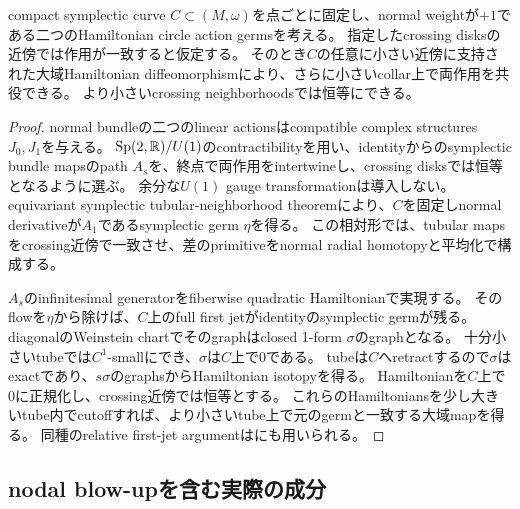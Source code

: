 \begin{lemma}\label{glue:circle}
compact symplectic curve $C\subset(M,\omega)$を点ごとに固定し、normal weightが$+1$である二つのHamiltonian circle action germsを考える。
指定したcrossing disksの近傍では作用が一致すると仮定する。
そのとき$C$の任意に小さい近傍に支持された大域Hamiltonian diffeomorphismにより、さらに小さいcollar上で両作用を共役できる。
より小さいcrossing neighborhoodsでは恒等にできる。
\end{lemma}
\begin{proof}
normal bundleの二つのlinear actionsはcompatible complex structures $J_0,J_1$を与える。
$\operatorname{Sp}(2,\mathbb R)/U(1)$のcontractibilityを用い、identityからのsymplectic bundle mapsのpath $A_s$を、終点で両作用をintertwineし、crossing disksでは恒等となるように選ぶ。
余分な$U(1)$ gauge transformationは導入しない。
equivariant symplectic tubular-neighborhood theoremにより、$C$を固定しnormal derivativeが$A_1$であるsymplectic germ $\eta$を得る\cite{DHJH}。
この相対形では、tubular mapsをcrossing近傍で一致させ、差のprimitiveをnormal radial homotopyと平均化で構成する。

$A_s$のinfinitesimal generatorをfiberwise quadratic Hamiltonianで実現する。
そのflowを$\eta$から除けば、$C$上のfull first jetがidentityのsymplectic germが残る。
diagonalのWeinstein chartでそのgraphはclosed 1-form $\sigma$のgraphとなる。
十分小さいtubeでは$C^1$-smallにでき、$\sigma$は$C$上で0である。
tubeは$C$へretractするので$\sigma$はexactであり、$s\sigma$のgraphsからHamiltonian isotopyを得る。
Hamiltonianを$C$上で0に正規化し、crossing近傍では恒等とする。
これらのHamiltoniansを少し大きいtube内でcutoffすれば、より小さいtube上で元のgermと一致する大域mapを得る。
同種のrelative first-jet argumentは\cite[Lemma 3.7]{CGblowup}にも用いられる。
\end{proof}

\subsection{nodal blow-upを含む実際の成分}

